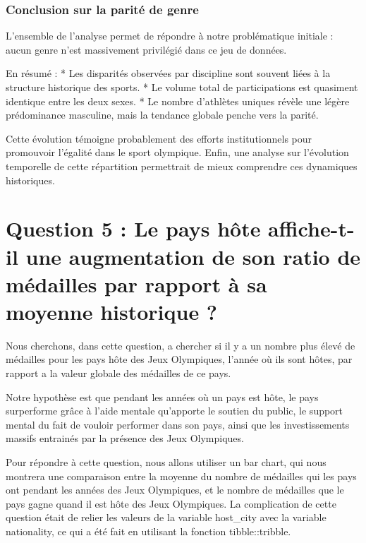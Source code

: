 \documentclass[
]{article}
\begin{document}
\subsubsection{Conclusion sur la parité de
genre}\label{conclusion-sur-la-parituxe9-de-genre}

L'ensemble de l'analyse permet de répondre à notre problématique
initiale : aucun genre n'est massivement privilégié dans ce jeu de
données.

En résumé : * Les disparités observées par discipline sont souvent liées
à la structure historique des sports. * Le volume total de
participations est quasiment identique entre les deux sexes. * Le nombre
d'athlètes uniques révèle une légère prédominance masculine, mais la
tendance globale penche vers la parité.

Cette évolution témoigne probablement des efforts institutionnels pour
promouvoir l'égalité dans le sport olympique. Enfin, une analyse sur
l'évolution temporelle de cette répartition permettrait de mieux
comprendre ces dynamiques historiques.

\section{Question 5 : Le pays hôte affiche-t-il une augmentation de son
ratio de médailles par rapport à sa moyenne historique
?}\label{question-5-le-pays-huxf4te-affiche-t-il-une-augmentation-de-son-ratio-de-muxe9dailles-par-rapport-uxe0-sa-moyenne-historique}

Nous cherchons, dans cette question, a chercher si il y a un nombre plus
élevé de médailles pour les pays hôte des Jeux Olympiques, l'année où
ils sont hôtes, par rapport a la valeur globale des médailles de ce
pays.

Notre hypothèse est que pendant les années où un pays est hôte, le pays
surperforme grâce à l'aide mentale qu'apporte le soutien du public, le
support mental du fait de vouloir performer dans son pays, ainsi que les
investissements massifs entrainés par la présence des Jeux Olympiques.

Pour répondre à cette question, nous allons utiliser un bar chart, qui
nous montrera une comparaison entre la moyenne du nombre de médailles
qui les pays ont pendant les années des Jeux Olympiques, et le nombre de
médailles que le pays gagne quand il est hôte des Jeux Olympiques. La
complication de cette question était de relier les valeurs de la
variable host\_city avec la variable nationality, ce qui a été fait en
utilisant la fonction tibble::tribble.
\end{document}

